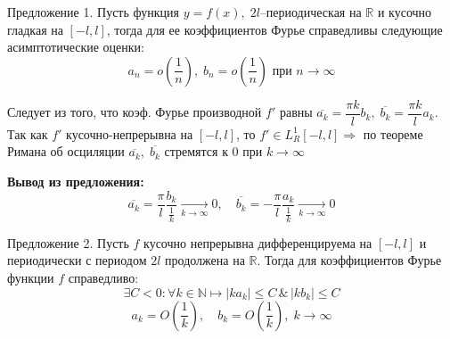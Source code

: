 \begin{greySmth}{Предложение 1.} Пусть функция $ y=f(x),\;2l $--периодическая на $ \mathbb{R} $ и кусочно гладкая на $ [-l,l] $, тогда для ее коэффициентов Фурье справедливы следующие асимптотические оценки:
\[
	a_n = o\left( \dfrac{1}{n} \right),\; b_n = o\left( \dfrac{1}{n} \right) \text{ при } n \rightarrow \infty 
\]
\end{greySmth}
\begin{greyProof}
	Следует из того, что коэф. Фурье производной $ f' $ равны $ \overline{a_k}  = \dfrac{\pi k}{l} b_k,\; \overline{b_k} = \dfrac{\pi k}{l}a_k$. Так как $ f' $ кусочно-непрерывна на $ [-l,l] $, то $ f' \in L_R^1[-l,l]  \Rightarrow $ по теореме Римана об осциляции $ \overline{a_k},\; \overline{b_k} $ стремятся к 0 при $ k \rightarrow \infty $
\end{greyProof}
\textbf{Вывод из предложения:} 
\[
	\overline{a_k} = \dfrac{\pi}{l} \dfrac{b_k}{\frac{1}{k}} \underset{k\rightarrow \infty}{\longrightarrow} 0,\quad \overline{b_k} = -\dfrac{\pi}{l} \dfrac{a_k}{\frac{1}{k}} \underset{k\rightarrow \infty}{\longrightarrow} 0
\]
\begin{greySmth}{Предложение 2.} Пусть $ f $ кусочно непрерывна дифференцируема на $ [-l,l] $ и периодически с периодом $ 2l $ продолжена на $ \mathbb{R} $. Тогда для коэффициентов Фурье функции $ f $ справедливо:
\[
	\exists C<0: \forall k \in \mathbb{N} \mapsto |ka_k| \leqslant C \,\&\, |kb_k| \leqslant C
\]
\[
	a_k = O \left( \dfrac{1}{k} \right),\quad b_k = O\left( \dfrac{1}{k} \right),\; k\rightarrow \infty
\]
\end{greySmth}
